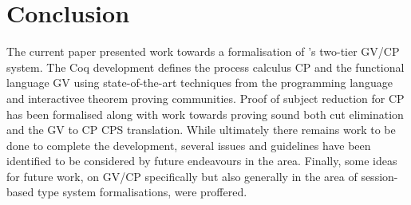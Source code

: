 \section{Conclusion}

The current paper presented work towards a formalisation of
\citeauthor{Wadler:2014}'s two-tier GV/CP system. The Coq development defines
the process calculus CP and the functional language GV using state-of-the-art
techniques from the programming language and interactivee theorem proving
communities. Proof of subject reduction for CP has been formalised along with
work towards proving sound both cut elimination and the GV to CP CPS
translation. While ultimately there remains work to be done to complete the
development, several issues and guidelines have been identified to be
considered by future endeavours in the area. Finally, some ideas for future
work, on GV/CP specifically but also generally in the area of session-based
type system formalisations, were proffered.
